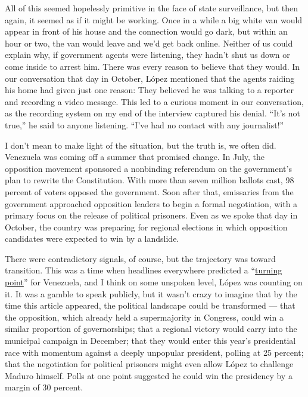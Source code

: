 All of this seemed hopelessly primitive in the face of state
surveillance, but then again, it seemed as if it might be working. Once
in a while a big white van would appear in front of his house and the
connection would go dark, but within an hour or two, the van would leave
and we'd get back online. Neither of us could explain why, if government
agents were listening, they hadn't shut us down or come inside to arrest
him. There was every reason to believe that they would. In our
conversation that day in October, López mentioned that the agents
raiding his home had given just one reason: They believed he was talking
to a reporter and recording a video message. This led to a curious
moment in our conversation, as the recording system on my end of the
interview captured his denial. ``It's not true,'' he said to anyone
listening. ``I've had no contact with any journalist!''

I don't mean to make light of the situation, but the truth is, we often
did. Venezuela was coming off a summer that promised change. In July,
the opposition movement sponsored a nonbinding referendum on the
government's plan to rewrite the Constitution. With more than seven
million ballots cast, 98 percent of voters opposed the government. Soon
after that, emissaries from the government approached opposition leaders
to begin a formal negotiation, with a primary focus on the release of
political prisoners. Even as we spoke that day in October, the country
was preparing for regional elections in which opposition candidates were
expected to win by a landslide.

There were contradictory signals, of course, but the trajectory was
toward transition. This was a time when headlines everywhere predicted a
``\href{https://www.washingtonpost.com/world/the-venezuelan-government-is-beginning-to-lose-the-poor-its-longtime-base/2017/04/28/c562cb86-2b5d-11e7-9081-f5405f56d3e4_story.html?utm_term=.d7487c5be838}{turning
point}'' for Venezuela, and I think on some unspoken level, López was
counting on it. It was a gamble to speak publicly, but it wasn't crazy
to imagine that by the time this article appeared, the political
landscape could be transformed --- that the opposition, which already
held a supermajority in Congress, could win a similar proportion of
governorships; that a regional victory would carry into the municipal
campaign in December; that they would enter this year's presidential
race with momentum against a deeply unpopular president, polling at 25
percent; that the negotiation for political prisoners might even allow
López to challenge Maduro himself. Polls at one point suggested he could
win the presidency by a margin of 30 percent.

